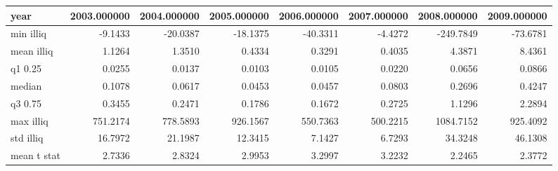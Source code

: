 \begin{tabular}{l|rrrrrrr}
\toprule
year & 2003.000000 & 2004.000000 & 2005.000000 & 2006.000000 & 2007.000000 & 2008.000000 & 2009.000000 \\
\midrule
min illiq & -9.1433 & -20.0387 & -18.1375 & -40.3311 & -4.4272 & -249.7849 & -73.6781 \\
mean illiq & 1.1264 & 1.3510 & 0.4334 & 0.3291 & 0.4035 & 4.3871 & 8.4361 \\
q1 0.25 & 0.0255 & 0.0137 & 0.0103 & 0.0105 & 0.0220 & 0.0656 & 0.0866 \\
median & 0.1078 & 0.0617 & 0.0453 & 0.0457 & 0.0803 & 0.2696 & 0.4247 \\
q3 0.75 & 0.3455 & 0.2471 & 0.1786 & 0.1672 & 0.2725 & 1.1296 & 2.2894 \\
max illiq & 751.2174 & 778.5893 & 926.1567 & 550.7363 & 500.2215 & 1084.7152 & 925.4092 \\
std illiq & 16.7972 & 21.1987 & 12.3415 & 7.1427 & 6.7293 & 34.3248 & 46.1308 \\
mean t stat & 2.7336 & 2.8324 & 2.9953 & 3.2997 & 3.2232 & 2.2465 & 2.3772 \\
\bottomrule
\end{tabular}
